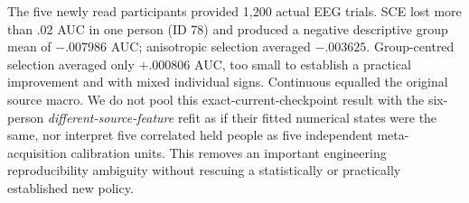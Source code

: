 The five newly read participants provided
1,200 actual EEG trials. SCE lost more than
.02 AUC in one person (ID 78) and produced
a negative descriptive group mean of
$-.007986$ AUC; anisotropic
selection averaged $-.003625$.
Group-centred selection averaged
only $+.000806$ AUC, too small to establish
a practical improvement and with mixed
individual signs. Continuous equalled
the original source macro. We do not pool
this exact-current-checkpoint result with
the six-person \emph{different-source-feature}
refit as if their fitted numerical states
were the same, nor interpret five correlated
held people as five independent
meta-acquisition calibration units.
This removes an important engineering
reproducibility ambiguity without rescuing
a statistically or practically established
new policy.
